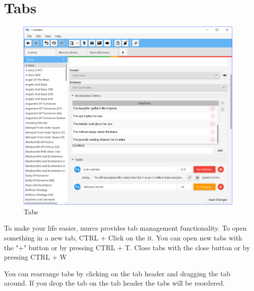 \section{Tabs}

\begin{figure}[H]
\centering
\includegraphics[width=\textwidth]{images/screenshots/tabs1.png}
\caption{Tabs}
\label{fig:revert}
\end{figure}

To make your life easier, murcs provides tab management functionality. To open something in a new tab, CTRL + Click on the it. You can open new tabs with the "+" button or by pressing CTRL + T. Close tabs with the close button or by pressing CTRL + W

\newline

You can rearrange tabs by clicking on the tab header and dragging the tab around. If you drop the tab on the tab header the tabs will be reordered.

